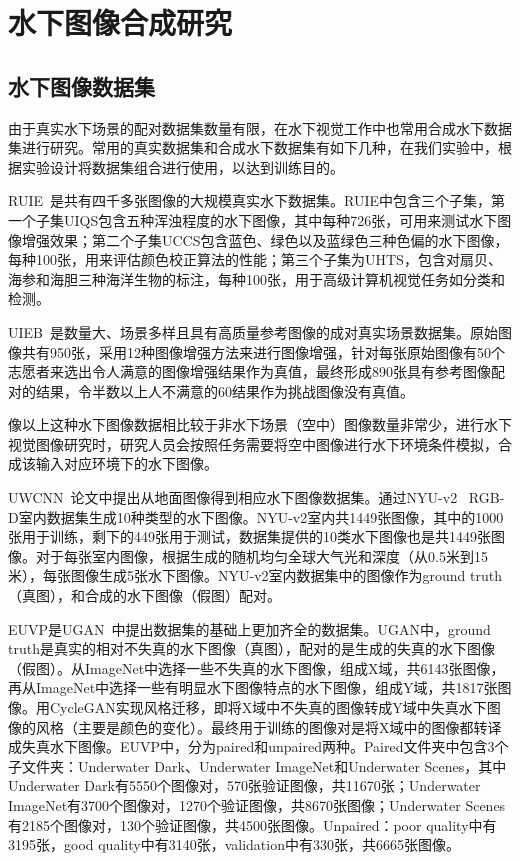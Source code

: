 \section{水下图像合成研究}
\subsection{水下图像数据集}
由于真实水下场景的配对数据集数量有限，在水下视觉工作中也常用合成水下数据集进行研究。常用的真实数据集和合成水下数据集有如下几种，在我们实验中，根据实验设计将数据集组合进行使用，以达到训练目的。

RUIE~\cite{liu2019real}是共有四千多张图像的大规模真实水下数据集。RUIE中包含三个子集，第一个子集UIQS包含五种浑浊程度的水下图像，其中每种726张，可用来测试水下图像增强效果；第二个子集UCCS包含蓝色、绿色以及蓝绿色三种色偏的水下图像，每种100张，用来评估颜色校正算法的性能；第三个子集为UHTS，包含对扇贝、海参和海胆三种海洋生物的标注，每种100张，用于高级计算机视觉任务如分类和检测。

UIEB~\cite{li2019underwater}是数量大、场景多样且具有高质量参考图像的成对真实场景数据集。原始图像共有950张，采用12种图像增强方法来进行图像增强，针对每张原始图像有50个志愿者来选出令人满意的图像增强结果作为真值，最终形成890张具有参考图像配对的结果，令半数以上人不满意的60结果作为挑战图像没有真值。

像以上这种水下图像数据相比较于非水下场景（空中）图像数量非常少，进行水下视觉图像研究时，研究人员会按照任务需要将空中图像进行水下环境条件模拟，合成该输入对应环境下的水下图像。

UWCNN~\cite{li2020underwater}论文中提出从地面图像得到相应水下图像数据集。通过NYU-v2~\cite{Silberman:ECCV12} RGB-D室内数据集生成10种类型的水下图像。NYU-v2室内共1449张图像，其中的1000张用于训练，剩下的449张用于测试，数据集提供的10类水下图像也是共1449张图像。对于每张室内图像，根据生成的随机均匀全球大气光和深度（从0.5米到15米），每张图像生成5张水下图像。NYU-v2室内数据集中的图像作为ground truth（真图），和合成的水下图像（假图）配对。



EUVP是UGAN~\cite{fabbri2018enhancing}中提出数据集的基础上更加齐全的数据集。UGAN中，ground truth是真实的相对不失真的水下图像（真图），配对的是生成的失真的水下图像（假图）。从ImageNet中选择一些不失真的水下图像，组成X域，共6143张图像，再从ImageNet中选择一些有明显水下图像特点的水下图像，组成Y域，共1817张图像。用CycleGAN实现风格迁移，即将X域中不失真的图像转成Y域中失真水下图像的风格（主要是颜色的变化）。最终用于训练的图像对是将X域中的图像都转译成失真水下图像。EUVP中，分为paired和unpaired两种。Paired文件夹中包含3个子文件夹：Underwater Dark、Underwater ImageNet和Underwater Scenes，其中Underwater Dark有5550个图像对，570张验证图像，共11670张；Underwater ImageNet有3700个图像对，1270个验证图像，共8670张图像；Underwater Scenes有2185个图像对，130个验证图像，共4500张图像。Unpaired：poor quality中有3195张，good quality中有3140张，validation中有330张，共6665张图像。

